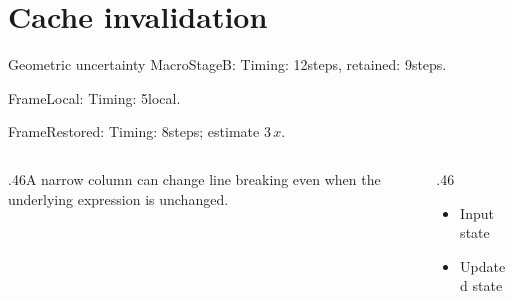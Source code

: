 \documentclass[10pt,aspectratio=169]{beamer}
\newcommand{\fuzzlayerA}[1]{\textrm{#1}}
\newcommand{\fuzzlayerB}[1]{\fuzzlayerA{#1}}
\newcommand{\fuzzterm}[1]{\fuzzlayerB{#1}}
\newcommand{\fuzzpair}[2]{\fuzzterm{#1}: #2}
\newcommand{\fuzzunit}{steps}
\let\fuzzoriginalunit\fuzzunit
\newcommand{\fuzzcoefficient}{3}
\newcommand{\fuzzscale}[2][\fuzzcoefficient]{#1\,#2}
\begin{document}
\section{Cache invalidation}
\begin{frame}[t]{Geometric uncertainty}
\fuzzpair{MacroStageB}{Timing: 12\fuzzunit, retained: 9\fuzzoriginalunit.}\par
{\renewcommand{\fuzzunit}{local}\fuzzpair{FrameLocal}{Timing: 5\fuzzunit.}\par}
\fuzzpair{FrameRestored}{Timing: 8\fuzzunit; estimate $\fuzzscale{x}$.}\par
\begin{columns}[T]\begin{column}{.46\textwidth}A narrow column can change line breaking even when the underlying expression is unchanged.\end{column}\begin{column}{.46\textwidth}\begin{itemize}\item Input state\item Updated state\end{itemize}\end{column}\end{columns}
\end{frame}
\end{document}
